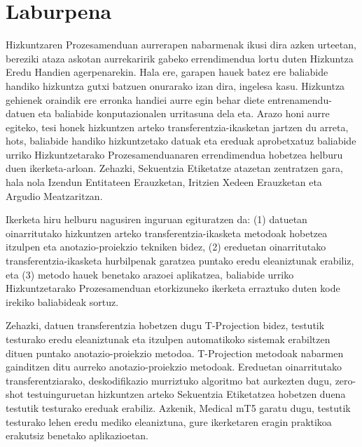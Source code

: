 
\chapter*{Laburpena}

Hizkuntzaren Prozesamenduan aurrerapen nabarmenak ikusi dira azken urteetan, bereziki ataza askotan aurrekaririk gabeko errendimendua lortu duten Hizkuntza Eredu Handien agerpenarekin. Hala ere, garapen hauek batez ere baliabide handiko hizkuntza gutxi batzuen onurarako izan dira, ingelesa kasu. Hizkuntza gehienek oraindik ere erronka handiei aurre egin behar diete entrenamendu-datuen eta baliabide konputazionalen urritasuna dela eta. Arazo honi aurre egiteko, tesi honek hizkuntzen arteko transferentzia-ikasketan jartzen du arreta, hots, baliabide handiko hizkuntzetako datuak eta ereduak aprobetxatuz baliabide urriko Hizkuntzetarako Prozesamenduanaren errendimendua hobetzea helburu duen ikerketa-arloan. Zehazki, Sekuentzia Etiketatze atazetan zentratzen gara, hala nola Izendun Entitateen Erauzketan, Iritzien Xedeen Erauzketan eta Argudio Meatzaritzan.

Ikerketa hiru helburu nagusiren inguruan egituratzen da: (1) datuetan oinarritutako hizkuntzen arteko transferentzia-ikasketa metodoak hobetzea itzulpen eta anotazio-proiekzio tekniken bidez, (2) ereduetan oinarritutako transferentzia-ikasketa hurbilpenak garatzea puntako eredu eleaniztunak erabiliz, eta (3) metodo hauek benetako arazoei aplikatzea, baliabide urriko Hizkuntzetarako Prozesamenduan etorkizuneko ikerketa erraztuko duten kode irekiko baliabideak sortuz.

Zehazki, datuen transferentzia hobetzen dugu T-Projection bidez, testutik testurako eredu eleaniztunak eta itzulpen automatikoko sistemak erabiltzen dituen puntako anotazio-proiekzio metodoa. T-Projection metodoak nabarmen gainditzen ditu aurreko anotazio-proiekzio metodoak. Ereduetan oinarritutako transferentziarako, deskodifikazio murriztuko algoritmo bat aurkezten dugu, zero-shot testuinguruetan hizkuntzen arteko Sekuentzia Etiketatzea hobetzen duena testutik testurako ereduak erabiliz. Azkenik, Medical mT5 garatu dugu, testutik testurako lehen eredu mediko eleaniztuna, gure ikerketaren eragin praktikoa erakutsiz benetako aplikazioetan.